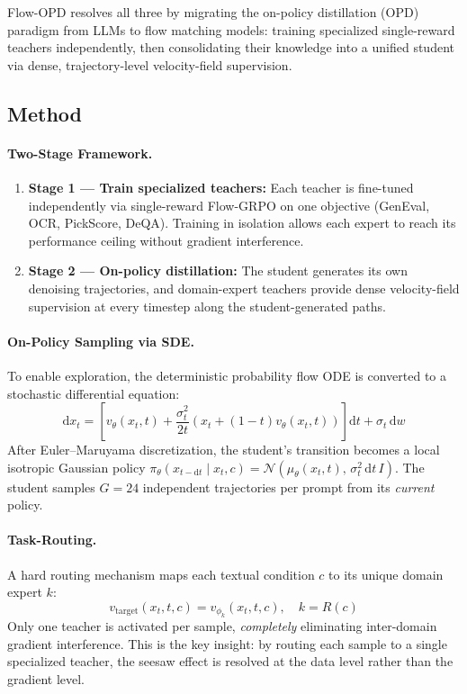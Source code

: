 \documentclass[11pt]{article}
\begin{document}
Flow-OPD resolves all three by migrating the on-policy distillation (OPD) paradigm from LLMs to flow matching models: training specialized single-reward teachers independently, then consolidating their knowledge into a unified student via dense, trajectory-level velocity-field supervision.

\subsection{Method}

\paragraph{Two-Stage Framework.}
\begin{enumerate}
    \item \textbf{Stage 1 --- Train specialized teachers:} Each teacher is fine-tuned independently via single-reward Flow-GRPO on one objective (GenEval, OCR, PickScore, DeQA). Training in isolation allows each expert to reach its performance ceiling without gradient interference.
    \item \textbf{Stage 2 --- On-policy distillation:} The student generates its own denoising trajectories, and domain-expert teachers provide dense velocity-field supervision at every timestep along the student-generated paths.
\end{enumerate}

\paragraph{On-Policy Sampling via SDE.}
To enable exploration, the deterministic probability flow ODE is converted to a stochastic differential equation:
\begin{equation}
    \mathrm{d}x_t = \!\left[v_\theta(x_t, t) + \frac{\sigma_t^2}{2t}\!\left(x_t + (1-t)v_\theta(x_t,t)\right)\right]\!\mathrm{d}t + \sigma_t\,\mathrm{d}w
\end{equation}
After Euler--Maruyama discretization, the student's transition becomes a local isotropic Gaussian policy $\pi_\theta(x_{t-\mathrm{d}t} \mid x_t, c) = \mathcal{N}(\mu_\theta(x_t, t),\, \sigma_t^2\,\mathrm{d}t\, I)$. The student samples $G = 24$ independent trajectories per prompt from its \emph{current} policy.

\paragraph{Task-Routing.}
A hard routing mechanism maps each textual condition $c$ to its unique domain expert $k$:
\begin{equation}
    v_{\mathrm{target}}(x_t, t, c) = v_{\phi_k}(x_t, t, c), \quad k = R(c)
\end{equation}
Only one teacher is activated per sample, \emph{completely} eliminating inter-domain gradient interference. This is the key insight: by routing each sample to a single specialized teacher, the seesaw effect is resolved at the data level rather than the gradient level.
\end{document}
